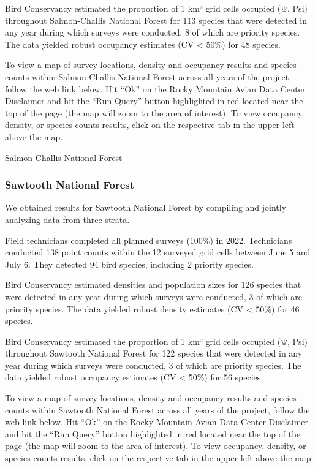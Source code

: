 \documentclass[
  letterpaper,
  DIV=11,
  numbers=noendperiod,
  oneside]{scrreprt}
\begin{document}
Bird Conservancy estimated the proportion of 1 km² grid cells occupied
(Ψ, Psi) throughout Salmon-Challis National Forest for 113 species that
were detected in any year during which surveys were conducted, 8 of
which are priority species. The data yielded robust occupancy estimates
(CV \textless{} 50\%) for 48 species.

To view a map of survey locations, density and occupancy results and
species counts within Salmon-Challis National Forest across all years of
the project, follow the web link below. Hit ``Ok'' on the Rocky Mountain
Avian Data Center Disclaimer and hit the ``Run Query'' button
highlighted in red located near the top of the page (the map will zoom
to the area of interest). To view occupancy, density, or species counts
results, click on the respective tab in the upper left above the map.

\href{http://www.rmbo.org/new_site/adc/QueryWindow.aspx\#N4IgzgrgDgpgTmALnAhoiBbEAuABCAZRQBsMB7AOwFoBhACxOIEsxcA5NJyk3AMTLgwkIAL5A===}{Salmon-Challis
National Forest}

\hypertarget{sawtooth-national-forest}{%
\subsubsection{Sawtooth National
Forest}\label{sawtooth-national-forest}}

We obtained results for Sawtooth National Forest by compiling and
jointly analyzing data from three strata.

Field technicians completed all planned surveys (100\%) in 2022.
Technicians conducted 138 point counts within the 12 surveyed grid cells
between June 5 and July 6. They detected 94 bird species, including 2
priority species.

Bird Conservancy estimated densities and population sizes for 126
species that were detected in any year during which surveys were
conducted, 3 of which are priority species. The data yielded robust
density estimates (CV \textless{} 50\%) for 46 species.

Bird Conservancy estimated the proportion of 1 km² grid cells occupied
(Ψ, Psi) throughout Sawtooth National Forest for 122 species that were
detected in any year during which surveys were conducted, 3 of which are
priority species. The data yielded robust occupancy estimates (CV
\textless{} 50\%) for 56 species.

To view a map of survey locations, density and occupancy results and
species counts within Sawtooth National Forest across all years of the
project, follow the web link below. Hit ``Ok'' on the Rocky Mountain
Avian Data Center Disclaimer and hit the ``Run Query'' button
highlighted in red located near the top of the page (the map will zoom
to the area of interest). To view occupancy, density, or species counts
results, click on the respective tab in the upper left above the map.
\end{document}
